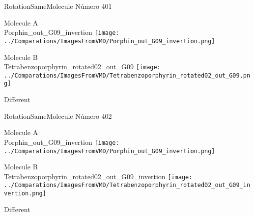 \vtab[-2cm]
\begin{center}
{\large RotationSameMolecule \tab Número 401}
\end{center}
\begin{multicols}{2}
\begin{center}
Molecule A \\ 
Porphin\_out\_G09\_invertion
\texttt{[image: ../Comparations/ImagesFromVMD/Porphin\_out\_G09\_invertion.png]}
\\
\vtab

\columnbreak
Molecule B \\ 
Tetrabenzoporphyrin\_rotated02\_out\_G09
\texttt{[image: ../Comparations/ImagesFromVMD/Tetrabenzoporphyrin\_rotated02\_out\_G09.png]}
\\
\vtab


\end{center}
\end{multicols}
\begin{center}
\vtab
\vtab
\textcolor{NavyBlue}{\Large Different}
\end{center}

 \newpage

\vtab[-2cm]
\begin{center}
{\large RotationSameMolecule \tab Número 402}
\end{center}
\begin{multicols}{2}
\begin{center}
Molecule A \\ 
Porphin\_out\_G09\_invertion
\texttt{[image: ../Comparations/ImagesFromVMD/Porphin\_out\_G09\_invertion.png]}
\\
\vtab

\columnbreak
Molecule B \\ 
Tetrabenzoporphyrin\_rotated02\_out\_G09\_invertion
\texttt{[image: ../Comparations/ImagesFromVMD/Tetrabenzoporphyrin\_rotated02\_out\_G09\_invertion.png]}
\\
\vtab


\end{center}
\end{multicols}
\begin{center}
\vtab
\vtab
\textcolor{NavyBlue}{\Large Different}
\end{center}

 \newpage

